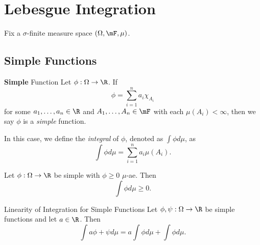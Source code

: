 \documentclass[stat901]{subfiles}
\begin{document}
    \section{Lebesgue Integration}

    Fix a $\sigma$-finite measure space $\left( \Omega,\mF,\mu \right)$. 

    \subsection{Simple Functions}
    
    \begin{definition}{\textbf{Simple} Function}
        Let $\phi:\Omega\to\R$. If
        \begin{equation*}
            \phi = \sum^{n}_{i=1} a_i\chi_{A_i}
        \end{equation*}
        for some $a_1,\ldots,a_n\in\R$ and $A_1,\ldots,A_n\in\mF$ with each $\mu\left( A_i \right)<\infty$, then we say $\phi$ is a \emph{simple} function.

        In this case, we define the \emph{integral} of $\phi$, denoted as $\int\phi d\mu$, as
        \begin{equation*}
            \int\phi d\mu = \sum^{n}_{i=1}a_i\mu\left( A_i \right).
        \end{equation*}
    \end{definition}

    \begin{lemma}{}
        Let $\phi:\Omega\to\R$ be simple with $\phi\geq 0$ $\mu$-ae. Then
        \begin{equation*}
            \int\phi d\mu\geq 0.
        \end{equation*}
    \end{lemma}

    \rruleline

    \begin{lemma}{Linearity of Integration for Simple Functions}
        Let $\phi,\psi:\Omega\to\R$ be simple functions and let $a\in\R$. Then
        \begin{equation*}
            \int a\phi+\psi d\mu = a\int\phi d\mu + \int \phi d\mu.
        \end{equation*}
    \end{lemma}
\end{document}
